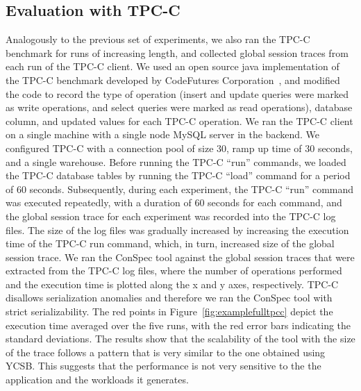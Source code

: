 \documentclass[conference]{IEEEtran}
\begin{document}
	\subsection{Evaluation with TPC-C}\label{sec:evaltpcc}
	Analogously to the previous set of experiments, we also ran the TPC-C benchmark for runs of increasing length, and collected global session traces from each run of the TPC-C client. We used an open source java implementation of the TPC-C benchmark developed by CodeFutures Corporation~\cite{Tpcc2015}, and modified the code to record the type of operation  (insert and update queries were marked as write operations, and select queries were marked as read operations), database column, and updated values for each TPC-C operation.  We ran the TPC-C client on a single  machine with a single node MySQL server in the backend. We configured TPC-C with a connection pool of size 30, ramp up time of 30 seconds, and a single warehouse. Before running the TPC-C ``run'' commands, we loaded the TPC-C database tables by running the TPC-C ``load'' command for a period of 60 seconds. Subsequently,  during each experiment, the TPC-C ``run'' command was executed repeatedly, with a duration of 60 seconds for each command, and the global session trace for each experiment was recorded into the TPC-C log files. The size of the log files was gradually increased by increasing the execution time of the TPC-C run command, which, in turn, increased size of the global session trace.  We ran the ConSpec tool against the global session traces that were extracted from the TPC-C log files, where the number of operations performed and the execution time is plotted along the x and y axes, respectively. TPC-C  disallows serialization anomalies and therefore we ran the ConSpec tool with strict serializability. The red points in Figure~\ref{fig:examplefulltpcc} depict the execution time averaged over the five runs, with the red error bars indicating the standard deviations.
	The results show that the scalability of the tool with the size of the trace follows a pattern that is very similar to the one obtained using YCSB. This suggests that the performance is not very sensitive to the the application and the workloads it generates.
	
\end{document}
